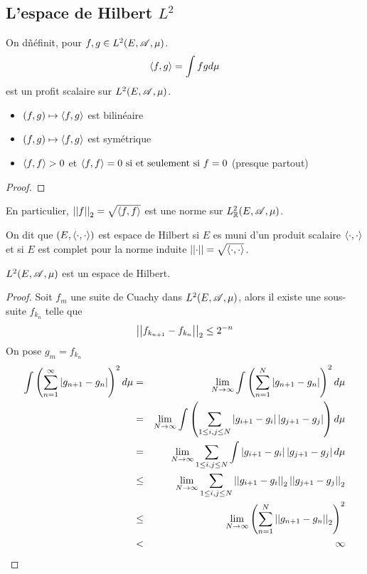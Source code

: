 \subsection{L'espace de Hilbert $L^2$}

\begin{definition}
	On dñéfinit, pour $f,g \in L^2(E,\mathscr{A}, \mu)$.
	$$\left\langle f, g \right\rangle = \int fg d \mu$$
	est un profit scalaire sur $L^2(E, \mathscr{A}, \mu)$.
	\begin{itemize}
		\item $(f,g) \mapsto \left\langle f, g \right\rangle$ est bilinéaire
		\item $(f,g) \mapsto \left\langle f, g \right\rangle$ est symétrique
		\item $\left\langle f, f \right\rangle > 0$ et $\left\langle f, f \right\rangle = 0 \text{ si et seulement si } f = 0$ (presque partout)
	\end{itemize}
\end{definition}


\begin{proof}
\end{proof}


\begin{remarque}
	En particulier, $\left|\left|f\right|\right|_2 = \sqrt{\left\langle f, f \right\rangle}$ est une norme sur $L^2_{\mathbb{R}}(E, \mathscr{A}, \mu)$.
\end{remarque}

\begin{definition}
	On dit que $(E, \left\langle \cdot, \cdot \right\rangle)$  est espace de Hilbert si $E$ es muni d'un produit scalaire $\left\langle \cdot, \cdot \right\rangle$ et
	si $E$ est complet pour la norme induite $\left|\left|\cdot\right|\right| = \sqrt{\left\langle \cdot, \cdot \right\rangle}$.
\end{definition}

\begin{theorem}[Riesz]
	$L^2(E, \mathscr{A}, \mu)$ est un espace de Hilbert.
\end{theorem}

\begin{proof}
	Soit $f_m$ une suite de Cuachy dans $L^2(E, \mathscr{A}, \mu)$, alors il existe une sous-suite $f_{k_n}$ telle que
	$$\left|\left|f_{k_{n+1}} - f_{k_n}\right|\right|_2 \leq 2^{-n}$$
	On pose $g_m = f_{k_n}$
	\begin{eqnarray*}
		\int \left( \sum\limits_{n=1}^\infty \left|g_{n+1} - g_n\right| \right)^2 d \mu &=& \lim_{N \to \infty} \int \left( \sum\limits_{n=1}^N \left|g_{n+1} - g_n\right| \right)^2 d \mu \\
		&=& \lim_{N \to \infty} \int \left( \sum\limits_{1 \leq i, j \leq N} \left|g_{i+1} - g_i\right| \left|g_{j+1} - g_j\right| \right) d \mu \\
		&=& \lim_{N \to \infty}   \sum\limits_{1 \leq i, j \leq N} \int\left|g_{i+1} - g_i\right| \left|g_{j+1} - g_j\right|  d \mu \\
		&\leq& \lim_{N \to \infty} \sum\limits_{1 \leq i, j \leq N} \left|\left|g_{i+1} - g_i\right|\right|_2 \left|\left|g_{j+1} - g_j\right|\right|_2 \\
		&\leq& \lim_{N \to \infty} \left( \sum\limits_{n=1}^N \left|\left|g_{n+1} - g_n\right|\right|_2 \right)^2 \\
		&<& \infty
	\end{eqnarray*}
\end{proof}

